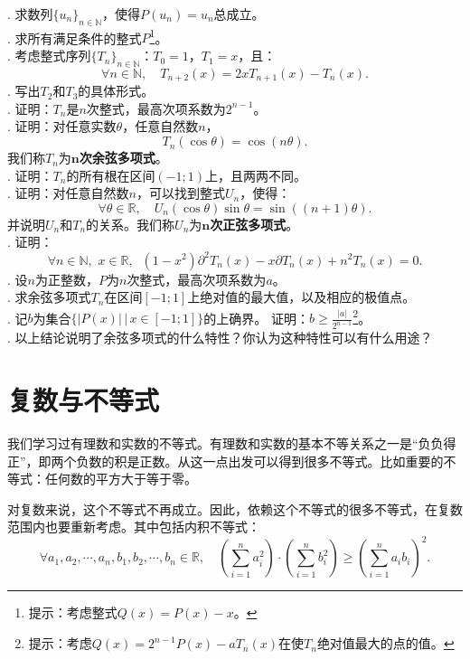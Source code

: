 \documentclass[12pt,UTF8]{ctexbook}
\begin{document}
\begin{appendix}
\begin{xt}
    . 求数列$\{u_n\}_{n\in\mathbb{N}}$，使得$P(u_n) = u_n$总成立。\\
    . 求所有满足条件的整式$P$\footnote{提示：考虑整式$Q(x) = P(x) - x$。}。\\
    . 考虑整式序列$\{T_n\}_{n\in\mathbb{N}}$：$T_0 = 1$，$T_1 = x$，且：
    $$ \forall n\in\mathbb{N}, \quad T_{n+2}(x) = 2xT_{n+1}(x) - T_n(x).$$
    . 写出$T_2$和$T_3$的具体形式。\\
    . 证明：$T_n$是$n$次整式，最高次项系数为$2^{n-1}$。\\
    . 证明：对任意实数$\theta$，任意自然数$n$，
    $$ T_n(\cos{\theta}) = \cos{(n\theta)}.$$
    我们称$T_n$为$\boldsymbol{n}$\textbf{次余弦多项式}。\\
    . 证明：$T_n$的所有根在区间$(-1;1)$上，且两两不同。\\
    . 证明：对任意自然数$n$，可以找到整式$U_n$，使得：
    $$ \forall \theta \in \mathbb{R}, \quad U_n(\cos{\theta}) \sin{\theta} = \sin{((n+1)\theta)}. $$
    并说明$U_n$和$T_n$的关系。我们称$U_n$为$\boldsymbol{n}$\textbf{次正弦多项式}。\\
    . 证明：
    $$ \forall n\in\mathbb{N},\,\, x\in\mathbb{R}, \;\; (1 - x^2)\partial^2 T_n(x) - x\partial T_n(x) + n^2 T_n(x) = 0.$$
    . 设$n$为正整数，$P$为$n$次整式，最高次项系数为$a$。\\
    . 求余弦多项式$T_n$在区间$[-1;1]$上绝对值的最大值，以及相应的极值点。\\
    . 记$b$为集合$\{|P(x)| \, | \, x\in[-1;1]\}$的上确界。
    证明：$b \geqslant \frac{|a|}{2^{n-1}}$\footnote{提示：考虑$Q(x) = 2^{n-1}P(x) - aT_n(x)$在使$T_n$绝对值最大的点的值。}。\\
    . 以上结论说明了余弦多项式的什么特性？你认为这种特性可以有什么用途？
\end{xt}

\section{复数与不等式}

我们学习过有理数和实数的不等式。有理数和实数的基本不等关系之一是“负负得正”，即两个负数的积是正数。从这一点出发可以得到很多不等式。比如重要的不等式：任何数的平方大于等于零。

对复数来说，这个不等式不再成立。因此，依赖这个不等式的很多不等式，在复数范围内也要重新考虑。其中包括内积不等式：
$$ \forall a_1, a_2, \cdots, a_n, b_1, b_2, \cdots, b_n \in \mathbb{R}, \quad \left(\sum_{i=1}^n a_i^2\right)\cdot\left(\sum_{i=1}^n b_i^2\right)\geqslant \left(\sum_{i=1}^n a_ib_i\right)^2.$$


\end{appendix}
\end{document}
